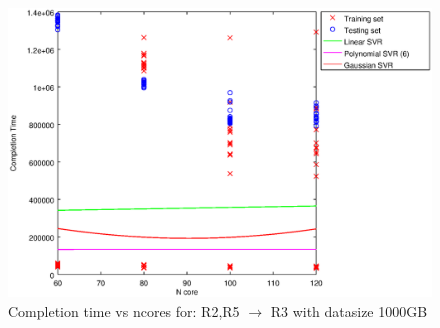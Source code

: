 
\begin {figure}[hbtp]
\centering
\includegraphics[width=\textwidth]{output/R2_R5_VS_R3_1000_ALL_FEATURES/plot_R2_R5_VS_R3_1000_bestmodels.eps}
\caption{Completion time vs ncores for: R2,R5 $\rightarrow$ R3 with datasize 1000GB}
\label{fig:coreonly_linear_R2,R5_R3_1000}
\end {figure}
